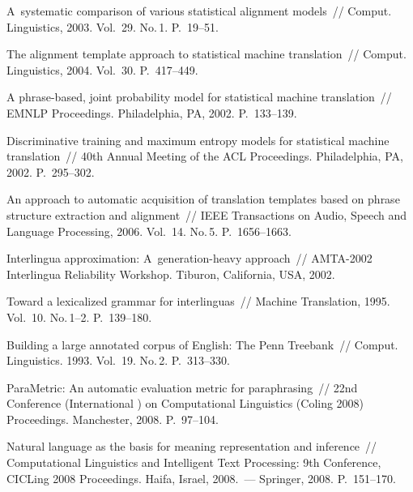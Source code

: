 \begin{multicols}{2}
{{\begin{thebibliography}{99}
    A~systematic comparison of various statistical alignment models~// 
Comput. Linguistics, 2003. Vol.~29. No.\,1. P.~19--51.
    
    The alignment template approach to statistical machine translation~// 
Comput. Linguistics, 2004. Vol.~30. P.~417--449.
    
    A phrase-based, joint probability model for statistical machine translation~// 
EMNLP Proceedings. Philadelphia, PA, 2002. P.~133--139. 
      
    Discriminative training and maximum entropy models for statistical machine 
translation~// 40th Annual Meeting of the ACL Proceedings. Philadelphia, 
PA, 2002. P.~295--302.
    
    An approach to automatic acquisition of translation templates based on phrase 
structure extraction and alignment~// IEEE Transactions on Audio, Speech and 
Language Processing, 2006. Vol.~14. No.\,5. P.~1656--1663.
    
    Interlingua approximation: A~generation-heavy approach~// AMTA-2002 
Interlingua Reliability Workshop. Tiburon, California, USA, 2002.
    
    Toward a lexicalized grammar for interlinguas~// Machine Translation, 1995. 
Vol.~10. No.\,1--2. P.~139--180.
    
    Building a large annotated corpus of English: The Penn Treebank~// 
Comput. Linguistics. 1993. Vol.~19. No.\,2. P.~313--330.
    
    ParaMetric: An automatic evaluation metric for paraphrasing~//  
22nd Conference (International ) on Computational Linguistics (Coling 
2008) Proceedings. Manchester, 2008. P.~97--104.
    
    Natural language as the basis for meaning representation and inference~// 
Computational Linguistics and Intelligent Text Processing: 9th 
Conference, CICLing 2008 Proceedings. Haifa, Israel, 2008.~--- Springer, 2008. P.~151--170.
    

\end{thebibliography}}}
\end{multicols}
